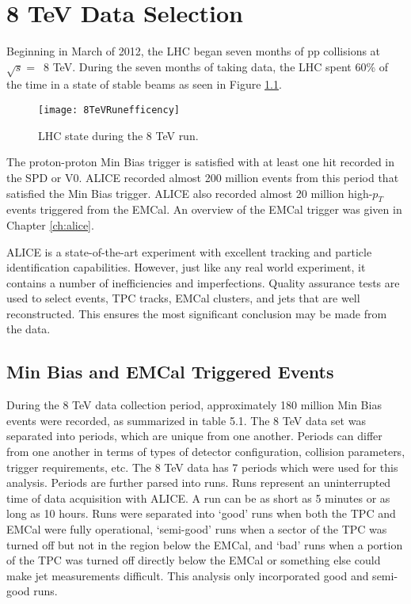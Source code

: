\chapter{8 TeV Data Selection} \label{ch:data}

Beginning in March of 2012, the LHC began seven months of pp collisions at $\sqrt{s} = \,$ 8 TeV. During the seven months of taking data, the LHC spent 60\% of the time in a state of stable beams as seen in Figure \ref{fig:RunEffer}.

\begin{figure}[h]
\texttt{[image: 8TeVRunefficency]}
\centering
\caption{LHC state during the 8 TeV run. }
\label{fig:RunEffer}
\end{figure}


The proton-proton Min Bias trigger is satisfied with at least one hit recorded in the SPD or V0.  ALICE recorded almost 200 million events from this period that satisfied the Min Bias trigger.  ALICE also recorded almost 20 million high-$p_{T}$ events triggered from the EMCal.  An overview of the EMCal trigger was given in Chapter \ref{ch:alice}.

ALICE is a state-of-the-art experiment with excellent tracking and particle identification capabilities.  However, just like any real world experiment, it contains a number of inefficiencies and imperfections.  Quality assurance tests are used to select events, TPC tracks, EMCal clusters, and jets that are well reconstructed.  This ensures the most significant conclusion may be made from the data.

\section{Min Bias and EMCal Triggered Events}

During the 8 TeV data collection period, approximately 180 million Min Bias events were recorded, as summarized in table 5.1.  The 8 TeV data set was separated into periods, which are unique from one another.  Periods can differ from one another in terms of types of detector configuration, collision parameters, trigger requirements, etc.  The 8 TeV data has 7 periods which were used for this analysis.  Periods are further parsed into runs.  Runs represent an uninterrupted time of data acquisition with ALICE. A run can be as short as 5 minutes or as long as 10 hours.  Runs were separated into `good' runs when both the TPC and EMCal were fully operational, `semi-good' runs when a sector of the TPC was turned off but not in the region below the EMCal, and `bad' runs when a portion of the TPC was turned off directly below the EMCal or something else could make jet measurements difficult.  This analysis only incorporated good and semi-good runs.

